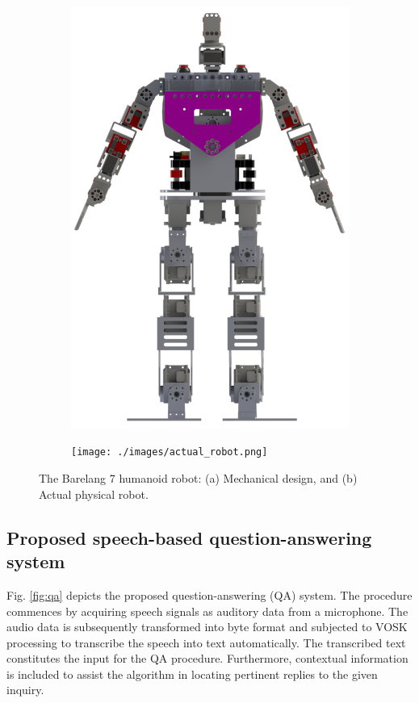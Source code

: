 \documentclass{../styles/svproc}
\begin{document}
\begin{figure}[t]
	\centering
	\begin{subfigure}{0.45\textwidth}
		\centering
		\includegraphics[width=\textwidth]{./images/robot_design.png}
		\caption{}
		\label{fig:robot_design}
	\end{subfigure}
	\hfill
	\begin{subfigure}{0.45\textwidth}
		\centering
		\texttt{[image: ./images/actual\_robot.png]}
		\caption{}
		\label{fig:actual_robot}
	\end{subfigure}
	\caption{The Barelang 7 humanoid robot: (a) Mechanical design, and (b) Actual physical robot.}
	\label{fig:robot_all}
\end{figure}

\subsection{Proposed speech-based question-answering system}
Fig. \ref{fig:qa} depicts the proposed question-answering (QA) system. The procedure commences by acquiring speech signals as auditory data from a microphone. The audio data is subsequently transformed into byte format and subjected to VOSK processing to transcribe the speech into text automatically. The transcribed text constitutes the input for the QA procedure. Furthermore, contextual information is included to assist the algorithm in locating pertinent replies to the given inquiry.
\end{document}
